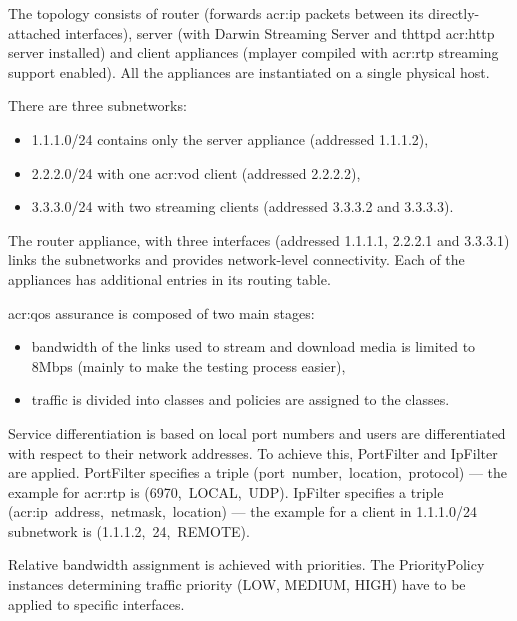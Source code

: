 \documentclass[11pt,openany]{book}
\begin{document}
        The topology consists of router (forwards \gls{acr:ip} packets between its directly-attached interfaces), server
        (with Darwin Streaming Server and thttpd \gls{acr:http} server installed) and client appliances (mplayer
        compiled with \gls{acr:rtp} streaming support enabled). All the appliances are instantiated on a single physical
        host.

        There are three subnetworks:

        \begin{itemize}
          \item 1.1.1.0/24 contains only the server appliance (addressed 1.1.1.2),
          \item 2.2.2.0/24 with one \gls{acr:vod} client (addressed 2.2.2.2),
          \item 3.3.3.0/24 with two streaming clients (addressed 3.3.3.2 and 3.3.3.3).
        \end{itemize}

        The router appliance, with three interfaces (addressed 1.1.1.1, 2.2.2.1 and 3.3.3.1) links the subnetworks and
        provides network-level connectivity. Each of the appliances has additional entries in its routing table.

        \gls{acr:qos} assurance is composed of two main stages:

        \begin{itemize}
          \item bandwidth of the links used to stream and download media is limited to 8Mbps (mainly to make the
                testing process easier),
          \item traffic is divided into classes and policies are assigned to the classes.
        \end{itemize}

        Service differentiation is based on local port numbers and users are differentiated with respect to their
        network addresses. To achieve this, PortFilter and IpFilter are applied. PortFilter specifies a triple
        \mbox{(port number, location, protocol)} --- the example for \gls{acr:rtp} is \mbox{(6970, LOCAL, UDP)}.
        IpFilter specifies a triple \mbox{(\gls{acr:ip} address, netmask, location)} --- the example for a client in
        1.1.1.0/24 subnetwork is \mbox{(1.1.1.2, 24, REMOTE)}.

        Relative bandwidth assignment is achieved with priorities. The PriorityPolicy instances determining traffic
        priority (LOW, MEDIUM, HIGH) have to be applied to specific interfaces.
\end{document}
